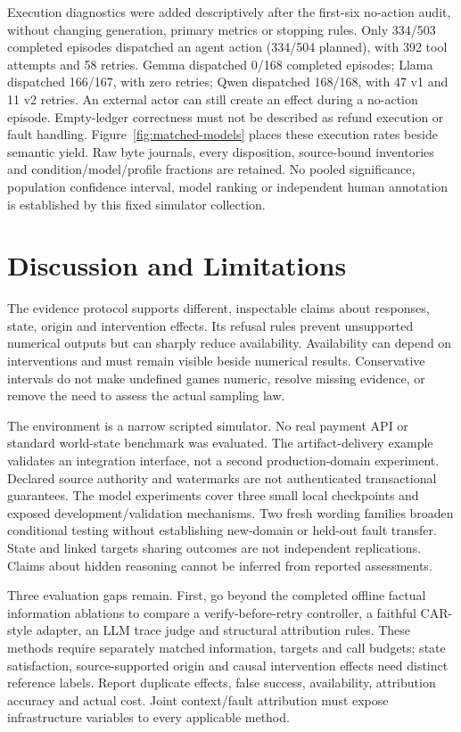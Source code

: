 \documentclass[conference]{IEEEtran}
\begin{document}
Execution diagnostics were added descriptively after the first-six no-action
audit, without changing generation, primary metrics or stopping rules. Only
334/503 completed episodes dispatched an agent action (334/504 planned), with
392 tool attempts and 58 retries. Gemma dispatched 0/168 completed episodes;
Llama dispatched 166/167, with zero retries; Qwen dispatched 168/168, with
47 v1 and 11 v2 retries. An external actor can still create an effect during a
no-action episode. Empty-ledger correctness must not be described as refund
execution or fault handling. Figure~\ref{fig:matched-models} places these
execution rates beside semantic yield. Raw byte journals, every disposition,
source-bound inventories and condition/model/profile fractions are retained.
No pooled significance, population confidence interval, model ranking or
independent human annotation is established by this fixed simulator collection.

\section{Discussion and Limitations}
The evidence protocol supports different, inspectable claims about responses,
state, origin and intervention effects. Its refusal rules prevent unsupported
numerical outputs but can sharply reduce availability. Availability can depend
on interventions and must remain visible beside numerical results. Conservative
intervals do not make undefined games numeric, resolve missing evidence, or
remove the need to assess the actual sampling law.

The environment is a narrow scripted simulator. No real payment API or standard
world-state benchmark was evaluated. The artifact-delivery example validates
an integration interface, not a second production-domain experiment. Declared
source authority and watermarks are not authenticated transactional guarantees.
The model experiments cover three small local checkpoints and exposed
development/validation mechanisms. Two fresh wording families broaden
conditional testing without establishing new-domain or held-out fault transfer.
State and linked targets sharing outcomes are not independent replications.
Claims about hidden reasoning cannot be inferred from reported assessments.

Three evaluation gaps remain. First, go beyond the completed offline factual
information ablations to compare a verify-before-retry controller, a faithful
CAR-style adapter, an LLM trace judge and structural attribution rules. These
methods require separately matched information, targets and call budgets;
state satisfaction, source-supported origin and causal intervention effects
need distinct reference labels. Report duplicate effects, false success,
availability, attribution accuracy and actual cost. Joint context/fault
attribution must expose infrastructure variables to every applicable method.
\end{document}
